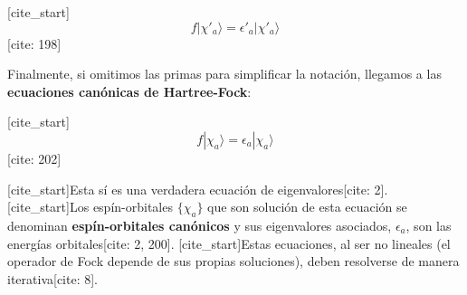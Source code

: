 \documentclass[12pt,a4paper]{article}
\begin{document}
[cite_start]$$ f|\chi'_a\rangle = \epsilon'_a |\chi'_a\rangle $$ [cite: 198]

Finalmente, si omitimos las primas para simplificar la notación, llegamos a las \textbf{ecuaciones canónicas de Hartree-Fock}:

[cite_start]$$ f|\chi_a\rangle = \epsilon_a |\chi_a\rangle $$ [cite: 202]

[cite_start]Esta sí es una verdadera ecuación de eigenvalores[cite: 2]. [cite_start]Los espín-orbitales $\{\chi_a\}$ que son solución de esta ecuación se denominan \textbf{espín-orbitales canónicos} y sus eigenvalores asociados, $\epsilon_a$, son las energías orbitales[cite: 2, 200]. [cite_start]Estas ecuaciones, al ser no lineales (el operador de Fock depende de sus propias soluciones), deben resolverse de manera iterativa[cite: 8].
\end{document}
